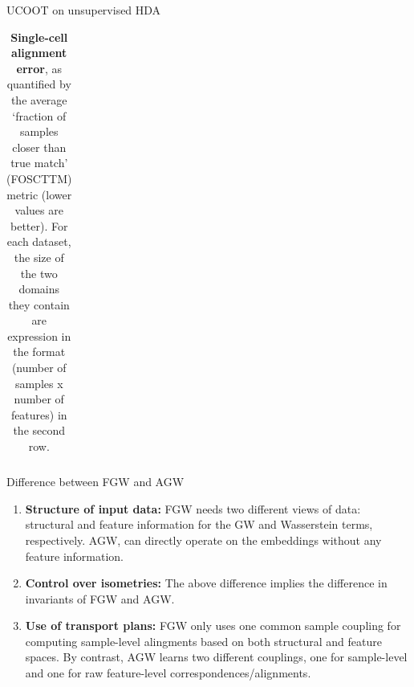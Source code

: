 \documentclass{beamer}
\begin{document}
\begin{frame}{UCOOT on unsupervised HDA}
\begin{table}[t]
\begin{center}
{\begin{tabular}{lccccccc}
    \end{tabular}}
    \end{center}
    \caption*{\scriptsize{\textbf{Single-cell alignment error},
    as quantified by the average `fraction of samples closer than true match'
    (FOSCTTM) metric (lower values are better).
    For each dataset, the size of the two domains they contain are expression in the format
    (number of samples x number of features) in the second row.
    }}
    \end{table}
\end{frame}

\begin{frame}{Difference between FGW and AGW}
\scriptsize
\begin{enumerate}
  \setlength\itemsep{0.3cm}
   \item \textbf{Structure of input data:}
   FGW needs two different views of data:
   structural and feature information for the GW and Wasserstein terms,
   respectively. AGW, can directly operate on the embeddings
   without any feature information.

   \item \textbf{Control over isometries:}
   The above difference implies the difference in invariants of FGW and AGW.

  \item \textbf{Use of transport plans:} FGW only uses one common
  sample coupling for computing sample-level alingments based
  on both structural and feature spaces.
  By contrast, AGW learns two different couplings,
  one for sample-level and one for raw feature-level
  correspondences/alignments.
\end{enumerate}
\end{frame}
\end{document}
